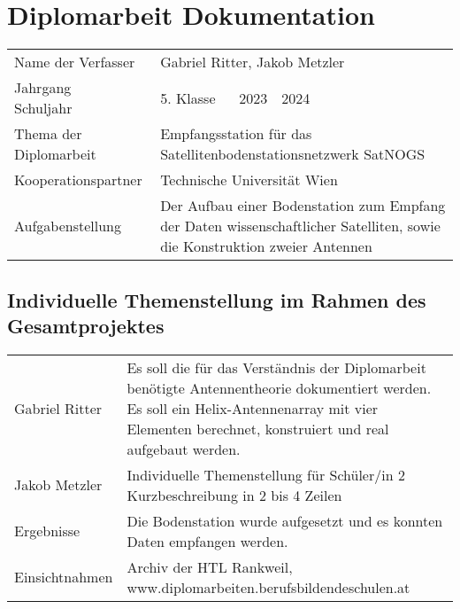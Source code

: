 \section *{Diplomarbeit Dokumentation}


\begin{tabular}{@{}p{5cm}p{8cm}}
	Name der Verfasser & Gabriel Ritter, Jakob Metzler \\
	
	Jahrgang ~\textbar~ Schuljahr & 5. Klasse ~\textbar~ 2023~\textbar~2024\\
	
	Thema der Diplomarbeit & Empfangsstation für das Satellitenbodenstationsnetzwerk SatNOGS\\
	
	Kooperationspartner & Technische Universität Wien \\
	
	Aufgabenstellung & Der Aufbau einer Bodenstation zum Empfang der Daten wissenschaftlicher Satelliten, sowie die Konstruktion zweier Antennen\\
\end{tabular}

\pagebreak

\subsection *{Individuelle Themenstellung im Rahmen des Gesamtprojektes}
\begin{tabular}{@{}p{5cm}p{8cm}}
	
	Gabriel Ritter & Es soll die für das Verständnis der Diplomarbeit benötigte Antennentheorie dokumentiert werden. Es soll ein Helix-Antennenarray mit vier Elementen berechnet, konstruiert und real aufgebaut werden. \\
	
	Jakob Metzler & Individuelle Themenstellung für Schüler/in 2	
	Kurzbeschreibung in 2 bis 4 Zeilen \\
	
	Ergebnisse & Die Bodenstation wurde aufgesetzt und es konnten Daten empfangen werden.\\
	
	Einsichtnahmen & Archiv der HTL Rankweil, \newline www.diplomarbeiten.berufsbildendeschulen.at \\
\end{tabular}
